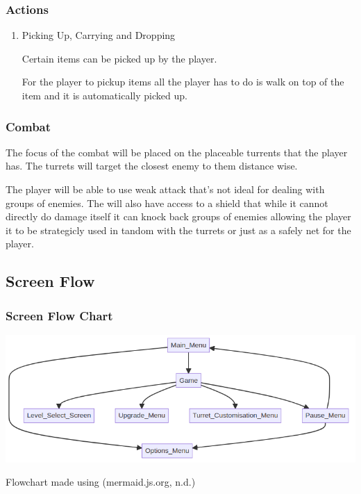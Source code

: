 \documentclass{article}
\begin{document}
\subsubsection{Actions}
\label{sec:orgd638caa}
\begin{enumerate}
\item Picking Up, Carrying and Dropping
\label{sec:org8702f79}

Certain items can be picked up by the player.

For the player to pickup items all the player has to do is walk on top of the item and it is automatically picked up.
\end{enumerate}
\subsubsection{Combat}
\label{sec:orgf6b9bca}
The focus of the combat will be placed on the placeable turrents that the player has.
The turrets will target the closest enemy to them distance wise.

The player will be able to use weak attack that's not ideal for dealing with groups of enemies.
The will also have access to a shield that while it cannot directly do damage itself it can knock back groups of enemies allowing the player it to be strategicly used in tandom with the turrets or just as a safely net for the player.
\subsection{Screen Flow}
\label{sec:org4d4128b}
\subsubsection{Screen Flow Chart}
\label{sec:org2dee068}
\begin{center}
\includegraphics[width=.9\linewidth]{screenflowchart.png}
\end{center}

Flowchart made using (mermaid.js.org, n.d.)
\end{document}
